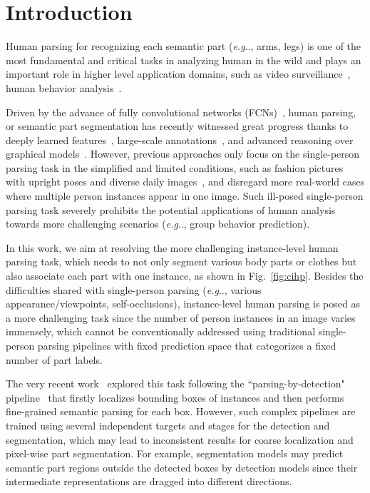 \documentclass[runningheads]{llncs}
\makeatletter
\DeclareRobustCommand\onedot{\futurelet\@let@token\@onedot}
\def\@onedot{\ifx\@let@token.\else.\null\fi\xspace}
\def\eg{\emph{e.g}\onedot} \def\Eg{\emph{E.g}\onedot}
\makeatother
\begin{document}
\section{Introduction}

Human parsing for recognizing each semantic part (\eg, arms, legs) is one of the most fundamental and critical tasks in analyzing human in the wild and plays an important role in higher level application domains, such as video surveillance~\cite{wang2014deformable}, human behavior analysis~\cite{gan2016concepts,liang2015proposal}.

Driven by the advance of fully convolutional networks (FCNs)~\cite{long2014fully}, human parsing, or semantic part segmentation has recently witnessed great progress thanks to deeply learned features~\cite{simonyan2014very,he2015deep}, large-scale annotations~\cite{DBLP:journals/corr/LinMBHPRDZ14,Gong_2017_CVPR}, and advanced reasoning over graphical models~\cite{crfasrnn,chen2016deeplab}. However, previous approaches only focus on the single-person parsing task in the simplified and limited conditions, such as fashion pictures~\cite{Yamaguchiparsing13,Dongparsing13,ATR,Co-CNN,chen2014detect} with upright poses and diverse daily images~\cite{Gong_2017_CVPR}, and disregard more real-world cases where multiple person instances appear in one image.  Such ill-posed single-person parsing task severely prohibits the potential applications of human analysis towards more challenging scenarios (\eg, group behavior prediction).

In this work, we aim at resolving the more challenging instance-level human parsing task, which needs to not only segment various body parts or clothes but also associate each part with one instance, as shown in Fig.~\ref{fig:cihp}. Besides the difficulties shared with single-person parsing (\eg, various appearance/viewpoints, self-occlusions), instance-level human parsing is posed as a more challenging task since the number of person instances in an image varies immensely, which cannot be conventionally addressed using traditional single-person parsing pipelines with fixed prediction space that categorizes a fixed number of part labels.

The very recent work~\cite{li2017holistic} explored this task following the ``parsing-by-detection" pipeline~\cite{hariharan2014simultaneous,liang2016reversible,Dai_2016_CVPR,pinheiro2015learning,He_2017_ICCV} that firstly localizes bounding boxes of instances and then performs fine-grained semantic parsing for each box. However, such complex pipelines are trained using several independent targets and stages for the detection and segmentation, which may lead to inconsistent results for coarse localization and pixel-wise part segmentation. For example, segmentation models may predict semantic part regions outside the detected boxes by detection models since their intermediate representations are dragged into different directions.
\end{document}
